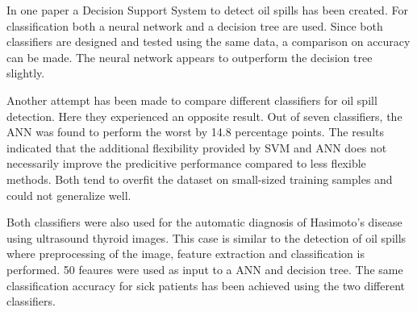 In one paper a Decision Support System to detect oil spills has been created. For classification both a neural network and a decision tree are used. Since both classifiers are designed and tested using the same data, a comparison on accuracy can be made. The neural network appears to outperform the decision tree slightly. \cite{Mera201472}
	
	Another attempt has been made to compare different classifiers for oil spill detection.\cite{Xu201414} Here they experienced an opposite result. Out of seven classifiers, the ANN was found to perform the worst by 14.8 percentage points. The results indicated that the additional flexibility provided by SVM and ANN does not necessarily improve the predicitive performance compared to less flexible methods. Both tend to overfit the dataset on small-sized training samples and could not generalize well.
	
	Both classifiers were also used for the automatic diagnosis of Hasimoto's disease using ultrasound thyroid images\cite{Omiotek201340}. This case is similar to the detection of oil spills where preprocessing of the image, feature extraction and classification is performed. 50 feaures were used as input to a ANN and decision tree. The same classification accuracy for sick patients has been achieved using the two different classifiers.


	